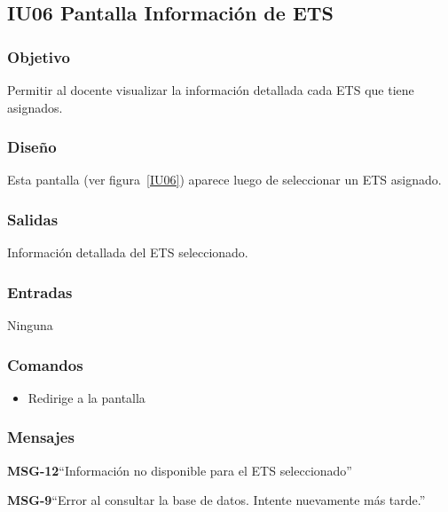 \subsection{IU06 Pantalla Información de ETS}

\subsubsection{Objetivo}
	Permitir al docente visualizar la información detallada cada ETS que tiene asignados.
	
\subsubsection{Diseño}
	Esta pantalla  (ver figura~\ref{IU06}) aparece luego de seleccionar un ETS asignado. 


\subsubsection{Salidas}

	Información detallada del ETS seleccionado. 

\subsubsection{Entradas}
Ninguna

\subsubsection{Comandos}
\begin{itemize}
	\item {} Redirige a la pantalla 
\end{itemize}

\subsubsection{Mensajes}

\begin{Citemize}
	\item {\bf MSG-12}{``Información no disponible para el ETS seleccionado''}
	\item {\bf MSG-9}{``Error al consultar la base de datos. Intente nuevamente más tarde.''}
\end{Citemize}

